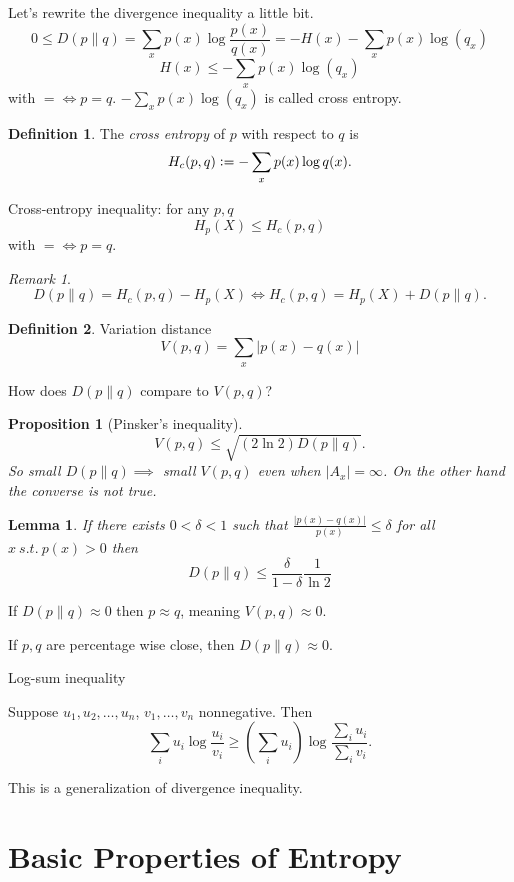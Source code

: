 \documentclass{report}
\newcommand{\st}{\ s.t.\ }
\newcommand{\defeq}{\vcentcolon=}
\newtheorem{lemma}{Lemma}[section]
\newtheorem{proposition}{Proposition}[section]
\theoremstyle{definition}
\newtheorem{definition}{Definition}[section]
\theoremstyle{remark}
\newtheorem*{remark}{Remark}
\numberwithin{equation}{section}
\begin{document}
Let's rewrite the divergence inequality a little bit.
\[
  0 \leq D(p \| q) = \sum_{x} p(x) \log \frac{p(x)}{q(x)} = -H(x) - \sum_x p(x) \log(q_x)  
\]
\[
  H(x) \leq - \sum_x p(x) \log(q_x)  
\] with $= \iff p = q$.
$- \sum_x p(x) \log(q_x) $ is called cross entropy. 
\begin{definition}
  The \emph{cross entropy} of $p$ with respect to $q$ is \[H_c(p, q) \defeq -\sum_x p(x) \log q(x).\]
\end{definition}

Cross-entropy inequality: for any $p, q$ \[
  H_p(X) \leq H_c(p, q)  
\] with $= \iff p = q$.

\begin{remark}
  \[
    D(p \| q) = H_c(p, q) - H_p(X) \iff H_c(p, q) = H_p(X) + D(p \| q).
  \]
\end{remark}

\begin{definition}
  Variation distance \[
    V(p, q) = \sum_x |p(x) - q(x)|  
  \]
\end{definition}
How does $D(p \| q)$ compare to $V(p, q)$?

\begin{proposition}[Pinsker's inequality]
  \[
    V(p, q) \leq \sqrt{(2 \ln 2)D(p \| q)}.
  \]
  So small $D(p \| q) \implies$ small $V(p,q)$ even when $|A_x| = \infty$. On the other hand the converse is not true.
\end{proposition}

\begin{lemma}
  If there exists $0 < \delta < 1$ such that $\frac{|p(x) - q(x)|}{p(x)} \leq \delta$ for all $x \st p(x) > 0$ then \[
    D(p \| q) \leq \frac{\delta}{1 - \delta}\frac{1}{\ln 2}  
  \]
\end{lemma}
If $D(p \| q) \approx 0$ then $p \approx q$, meaning $V(p, q) \approx 0$. 

If $p, q$ are percentage wise close, then $D(p \| q) \approx 0$.

Log-sum inequality

Suppose $u_1, u_2, \ldots, u_n$, $v_1, \ldots, v_n$ nonnegative. Then \[\sum_i u_i \log \frac{u_i}{v_i} \geq \left(\sum_i u_i\right)\log \frac{\sum_i u_i}{\sum_i v_i}.\]

This is a generalization of divergence inequality.


\section{Basic Properties of Entropy}
\end{document}
